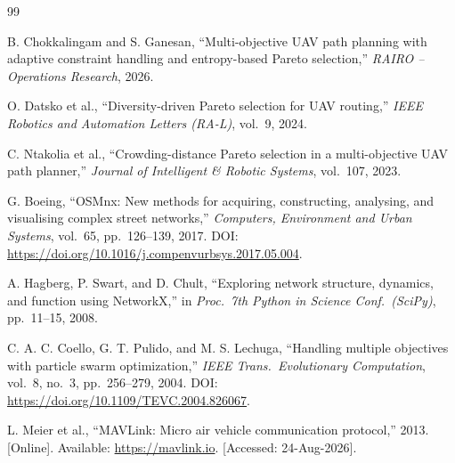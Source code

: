 \documentclass{ssnreview}
\begin{document}
\begin{thebibliography}{99}

 B. Chokkalingam and S. Ganesan, ``Multi-objective UAV path planning with
adaptive constraint handling and entropy-based Pareto selection,''
\textit{RAIRO -- Operations Research}, 2026.

 O. Datsko et al., ``Diversity-driven Pareto selection for UAV routing,''
\textit{IEEE Robotics and Automation Letters (RA-L)}, vol.~9, 2024.

 C. Ntakolia et al., ``Crowding-distance Pareto selection in a multi-objective
UAV path planner,'' \textit{Journal of Intelligent \& Robotic Systems}, vol.~107, 2023.

 G. Boeing, ``OSMnx: New methods for acquiring, constructing, analysing, and
visualising complex street networks,'' \textit{Computers, Environment and Urban Systems},
vol.~65, pp.~126--139, 2017. DOI: \url{https://doi.org/10.1016/j.compenvurbsys.2017.05.004}.

 A. Hagberg, P. Swart, and D. Chult, ``Exploring network structure,
dynamics, and function using NetworkX,'' in \textit{Proc.\ 7th Python in Science Conf.\
(SciPy)}, pp.~11--15, 2008.

 C. A. C. Coello, G. T. Pulido, and M. S. Lechuga, ``Handling multiple
objectives with particle swarm optimization,'' \textit{IEEE Trans.\ Evolutionary
Computation}, vol.~8, no.~3, pp.~256--279, 2004.
DOI: \url{https://doi.org/10.1109/TEVC.2004.826067}.

 L. Meier et al., ``MAVLink: Micro air vehicle communication protocol,''
2013. [Online]. Available: \url{https://mavlink.io}. [Accessed: 24-Aug-2026].

\end{thebibliography}
\end{document}

